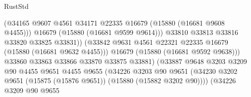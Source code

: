\begin{lexlean}{RustStd}
\begin{coremodule}
                                              (@34165
                                                @9607
                                                @4561
                                                @34171
                                                @22335
                                                @16679
                                                (@15880 (@16681 @9608 @4455)))
                                              @16679
                                              (@15880 (@16681 @9599 @9614)))
                                            @33810
                                            @33813
                                            @33816
                                            @33820
                                            @33825
                                            @33831))
                                        (@33842
                                          @9631
                                          @4561
                                          @22321
                                          @22335
                                          @16679
                                          (@15880 (@16681 @9632 @4455)))
                                        @16679
                                        (@15880 (@16681 @9592 @9638)))
                                      @33860
                                      @33863
                                      @33866
                                      @33870
                                      @33875
                                      @33881)
                                    (@33887
                                      @9648
                                      @3203
                                      @3209
                                      @90
                                      @4455
                                      @9651
                                      @4455
                                      @9655
                                      (@34226
                                        @3203
                                        @90
                                        @9651
                                        (@34230
                                          @3202
                                          @9651
                                          (@15875 (@15876 @9651))
                                          (@15880 (@15882 @3202 @90))))
                                      (@34226
                                        @3209
                                        @90
                                        @9655

\end{coremodule}
\end{lexlean}
